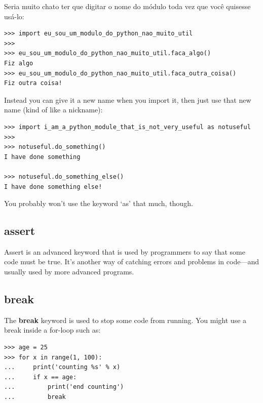 \noindent
Seria muito chato ter que digitar o nome do módulo toda vez que você quisesse usá-lo:

\begin{listingignore}
\begin{verbatim}
>>> import eu_sou_um_modulo_do_python_nao_muito_util
>>>
>>> eu_sou_um_modulo_do_python_nao_muito_util.faca_algo()
Fiz algo
>>> eu_sou_um_modulo_do_python_nao_muito_util.faca_outra_coisa()
Fiz outra coisa!
\end{verbatim}
\end{listingignore}

\noindent
Instead you can give it a new name when you import it, then just use that new name (kind of like a nickname):

\begin{listingignore}
\begin{verbatim}
>>> import i_am_a_python_module_that_is_not_very_useful as notuseful
>>>
>>> notuseful.do_something()
I have done something

>>> notuseful.do_something_else()
I have done something else!
\end{verbatim}
\end{listingignore}

\noindent
You probably won't use the keyword `as' that much, though.

\subsection*{assert}

Assert is an advanced keyword that is used by programmers to say that some code must be true. It's another way of catching errors and problems in code---and usually used by more advanced programs.

\subsection*{break}

The \textbf{break} keyword is used to stop some code from running. You might use a break inside a for-loop such as:

\begin{listing}
\begin{verbatim}
>>> age = 25
>>> for x in range(1, 100):
...     print('counting %s' % x)
...     if x == age:
...         print('end counting')
...         break
\end{verbatim}
\end{listing}

